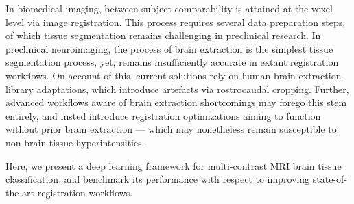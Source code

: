 In biomedical imaging, between-subject comparability is attained at the voxel level via image registration.
This process requires several data preparation steps, of which tissue segmentation remains challenging in preclinical research.
In preclinical neuroimaging, the process of brain extraction is the simplest tissue segmentation process, yet, remains insufficiently accurate in extant registration workflows.
On account of this, current solutions rely on human brain extraction library adaptations, which introduce artefacts via rostrocaudal cropping.
Further, advanced workflows aware of brain extraction shortcomings may forego this stem entirely, and insted introduce registration optimizations aiming to function without prior brain extraction --- which may nonetheless remain susceptible to non-brain-tissue hyperintensities.
\vspace{-.4em}

Here, we present a deep learning framework for multi-contrast MRI brain tissue classification, and benchmark its performance with respect to improving state-of-the-art registration workflows.
